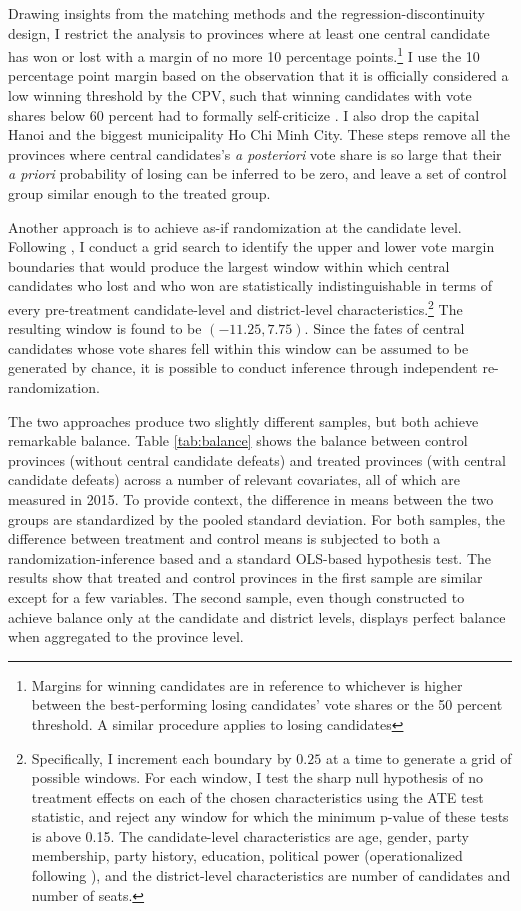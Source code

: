 \documentclass[12pt]{article}
\newcommand\fnote[1]{\footnote{\baselineskip=2\normalbaselineskip#1}}
\newcommand{\1}{\mathbbm{1}}
\begin{document}
Drawing insights from the matching methods and the regression-discontinuity design, I restrict the analysis to provinces where at least one central candidate has won or lost with a margin of no more 10 percentage points.\fnote{Margins for winning candidates are in reference to whichever is higher between the best-performing losing candidates' vote shares or the 50 percent threshold. A similar procedure applies to losing candidates} I use the 10 percentage point margin based on the observation that it is officially considered a low winning threshold by the CPV, such that winning candidates with vote shares below 60 percent had to formally self-criticize \citep{MaleskySchuler2011}. I also drop the capital Hanoi and the biggest municipality Ho Chi Minh City. These steps remove all the provinces where central candidates's \textit{a posteriori} vote share is so large that their \textit{a priori} probability of losing can be inferred to be zero, and leave a set of control group similar enough to the treated group.

Another approach is to achieve as-if randomization at the candidate level. Following \citet{CattaneoTitiunik2015}, I conduct a grid search to identify the upper and lower vote margin boundaries that would produce the largest window within which central candidates who lost and who won are statistically indistinguishable in terms of every pre-treatment candidate-level and district-level characteristics.\fnote{Specifically, I  increment each boundary by $0.25$ at a time to generate a grid of possible windows. For each window, I test the sharp null hypothesis of no treatment effects on each of the chosen characteristics using the ATE test statistic, and reject any window for which the minimum p-value of these tests is above 0.15. The candidate-level characteristics are age, gender, party membership, party history, education, political power (operationalized following \citet{MaleskySchuler2011}), and the district-level characteristics are number of candidates and number of seats.} The resulting window is found to be $(-11.25, 7.75)$. Since the fates of central candidates whose vote shares fell within this window can be assumed to be generated by chance, it is possible to conduct inference through independent re-randomization. 

The two approaches produce two slightly different samples, but both achieve remarkable balance. Table \ref{tab:balance} shows the balance between control provinces (without central candidate defeats) and treated provinces (with central candidate defeats) across a number of relevant covariates, all of which are measured in 2015. To provide context, the difference in means between the two groups are standardized by the pooled standard deviation. For both samples, the difference between treatment and control means is subjected to both a randomization-inference based and a standard OLS-based hypothesis test. The results show that treated and control provinces in the first sample are similar except for a few variables. The second sample, even though constructed to achieve balance only at the candidate and district levels, displays perfect balance when aggregated to the province level. 
\end{document}
